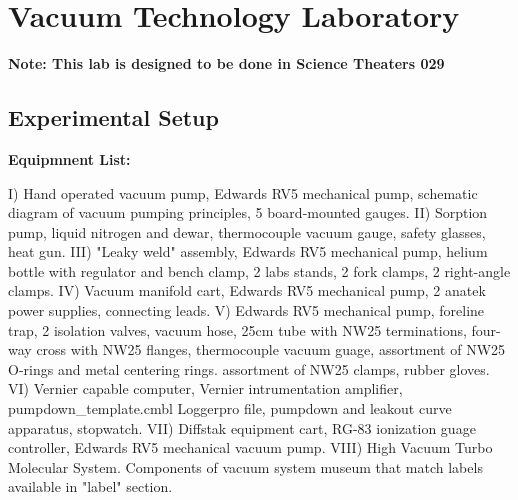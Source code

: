\documentclass{book}
\begin{document}


\section{Vacuum Technology Laboratory}

{\bf Note: This lab is designed to be done in Science Theaters 029}\newline


\subsection{Experimental Setup}

{\bf Equipmnent List:}

I)    Hand operated vacuum pump, Edwards RV5 mechanical pump, schematic diagram of vacuum pumping principles, 5 board-mounted gauges.\newline
II)   Sorption pump, liquid nitrogen and dewar, thermocouple vacuum gauge, safety glasses, heat gun.\newline
III)  "Leaky weld" assembly, Edwards RV5 mechanical pump, helium bottle with regulator and bench clamp, 2 labs stands, 2 fork clamps, 2 right-angle clamps.\newline
IV)   Vacuum manifold cart, Edwards RV5 mechanical pump, 2 anatek power supplies, connecting leads.\newline
V)    Edwards RV5 mechanical pump, foreline trap, 2 isolation valves, vacuum hose, 25cm tube with NW25 terminations, four-way cross with NW25 flanges, thermocouple vacuum guage, assortment of NW25 O-rings and metal centering rings. assortment of NW25 clamps, rubber gloves.\newline
VI)   Vernier capable computer, Vernier intrumentation amplifier, pumpdown_template.cmbl Loggerpro file, pumpdown and leakout curve apparatus, stopwatch.\newline
VII)  Diffstak equipment cart, RG-83 ionization guage controller, Edwards RV5 mechanical vacuum pump.
VIII) High Vacuum Turbo Molecular System.\newline
Components of vacuum system museum that match labels available in "label" section.\newline

\end{document}
